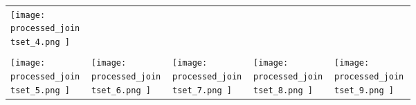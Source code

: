 \documentclass[a4paper, twoside, svgnames]{report}
\begin{document}
\begin{center}
\begin{figure*}[!h]
{\begin{tabular}{C{0.15\linewidth}C{0.15\linewidth}C{0.15\linewidth}C{0.15\linewidth}C{0.15\linewidth}}
            \begin{minipage}{\linewidth}\centering
                \texttt{[image:  processed\_jointset\_4.png ]}
                \caption{\scriptsize } %
            \end{minipage} \\
            
            \\[-5pt]
            
            \begin{minipage}{\linewidth}\centering
                \texttt{[image:  processed\_jointset\_5.png ]} 
                \caption{\scriptsize } %
            \end{minipage} &
            
            \begin{minipage}{\linewidth}\centering
                \texttt{[image:  processed\_jointset\_6.png ]} 
                \caption{\scriptsize } %
            \end{minipage} &
            
            \begin{minipage}{\linewidth}\centering
                \texttt{[image:  processed\_jointset\_7.png ]}
                \caption{\scriptsize } %
            \end{minipage} &
            
            \begin{minipage}{\linewidth}\centering
                \texttt{[image:  processed\_jointset\_8.png ]} 
                \caption{\scriptsize } %
            \end{minipage} &
            
            \begin{minipage}{\linewidth}\centering
                \texttt{[image:  processed\_jointset\_9.png ]}
                \caption{\scriptsize } %
            \end{minipage} \\
        \end{tabular}}
    \end{figure*}
\end{center}

    
\end{document}
